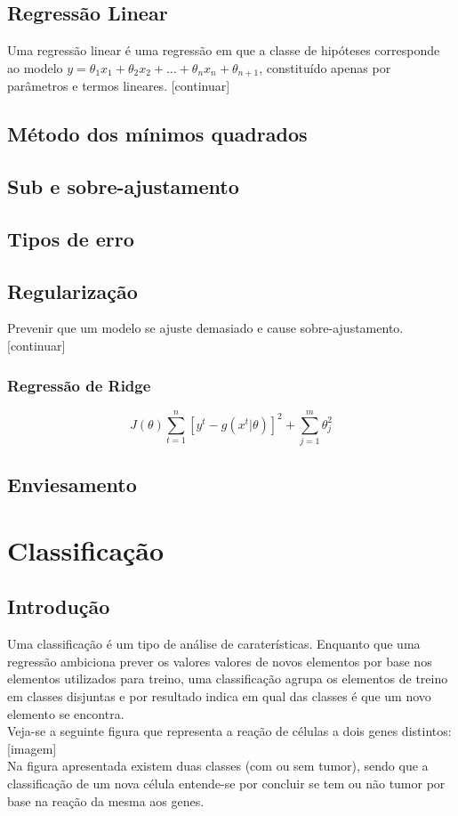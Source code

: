 \documentclass[]{report}
\begin{document}
\section{Regressão Linear}
Uma regressão linear é uma regressão em que a classe de hipóteses corresponde ao modelo $y = \theta_1 x_1 + \theta_2 x_2 + \dots + \theta_n x_n + \theta_{n+1}$, constituído apenas por parâmetros e termos lineares. [continuar]
\section{Método dos mínimos quadrados}
\section{Sub e sobre-ajustamento}
\section{Tipos de erro}
\section{Regularização}
Prevenir que um modelo se ajuste demasiado e cause sobre-ajustamento.[continuar]
\subsection{Regressão de Ridge}
$$J(\theta) \sum_{t=1}^n[y^t - g(x^t | \theta)]^2 + \sum_{j=1}^m \theta^2_j$$
\section{Enviesamento}
\chapter{Classificação}
\section{Introdução}
Uma classificação é um tipo de análise de caraterísticas. Enquanto que uma regressão ambiciona prever os valores valores de novos elementos por base nos elementos utilizados para treino, uma classificação agrupa os elementos de treino em classes disjuntas e por resultado indica em qual das classes é que um novo elemento se encontra.\\[0.2cm]
Veja-se a seguinte figura que representa a reação de células a dois genes distintos: [imagem]\\
Na figura apresentada existem duas classes (com ou sem tumor), sendo que a classificação de um nova célula entende-se por concluir se tem ou não tumor por base na reação da mesma aos genes.
\end{document}
